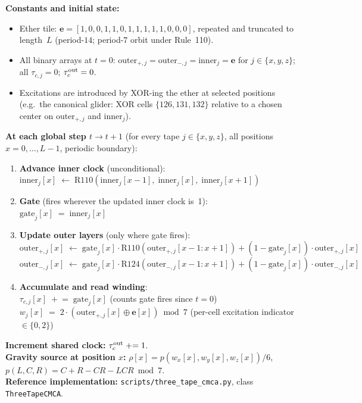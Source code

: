\documentclass[11pt]{article}
\theoremstyle{remark}
\newcommand{\taucout}{\tau_c^{\rm out}}
\newcommand{\ether}{\mathbf{e}}
\begin{document}
\begin{tcolorbox}[colback=gray!5,colframe=gray!50!black,
  title={\textbf{Algorithm~1: Three-Tape CMCA — Complete Per-Step Update}},
  fonttitle=\bfseries,left=6pt,right=6pt,top=5pt,bottom=5pt]
\small
\textbf{Constants and initial state:}
\begin{itemize}[noitemsep,topsep=2pt]
  \item Ether tile: $\mathbf{e} = [1,0,0,1,1,0,1,1,1,1,1,0,0,0]$,
        repeated and truncated to length~$L$ (period-$14$; period-$7$ orbit
        under Rule~110).
  \item All binary arrays at $t=0$: $\text{outer}_{+,j} =
        \text{outer}_{-,j} = \text{inner}_j = \ether$ for
        $j\in\{x,y,z\}$; all $\tau_{c,j} = 0$;
        $\taucout = 0$.
  \item Excitations are introduced by XOR-ing the ether at selected positions
        (e.g.\ the canonical glider: XOR cells $\{126,131,132\}$
        relative to a chosen center on $\text{outer}_{+,j}$ and
        $\text{inner}_j$).
\end{itemize}
\textbf{At each global step $t \to t+1$}
(for every tape $j \in \{x,y,z\}$,
all positions $x = 0,\ldots,L-1$, periodic boundary):
\begin{enumerate}[noitemsep,topsep=2pt]
  \item \textbf{Advance inner clock} (unconditional):\\
        $\text{inner}_j[x] \;\leftarrow\;
        \mathrm{R110}(\text{inner}_j[x{-}1],\;\text{inner}_j[x],\;
        \text{inner}_j[x{+}1])$
  \item \textbf{Gate} (fires wherever the updated inner clock is~1):\\
        $\text{gate}_j[x] \;=\; \text{inner}_j[x]$
  \item \textbf{Update outer layers} (only where gate fires):\\
        $\text{outer}_{+,j}[x] \;\leftarrow\; \text{gate}_j[x]
          \cdot\mathrm{R110}(\text{outer}_{+,j}[x{-}1{:}x{+}1])
          + (1-\text{gate}_j[x])\cdot\text{outer}_{+,j}[x]$\\
        $\text{outer}_{-,j}[x] \;\leftarrow\; \text{gate}_j[x]
          \cdot\mathrm{R124}(\text{outer}_{-,j}[x{-}1{:}x{+}1])
          + (1-\text{gate}_j[x])\cdot\text{outer}_{-,j}[x]$
  \item \textbf{Accumulate and read winding}:\\
        $\tau_{c,j}[x] \;\mathrel{+}=\; \text{gate}_j[x]$
        \hfill(counts gate fires since $t=0$)\\
        $w_j[x] \;=\; 2\cdot(\text{outer}_{+,j}[x] \oplus \ether[x])
          \bmod 7$
        \hfill(per-cell excitation indicator $\in\{0,2\}$)
\end{enumerate}
\textbf{Increment shared clock:} $\taucout \mathrel{+}= 1$.\\[2pt]
\textbf{Gravity source at position $x$:}
$\rho[x] = p(w_x[x],w_y[x],w_z[x])/6$,\quad
$p(L,C,R) = C+R-CR-LCR \bmod 7$.\\[2pt]
\textbf{Reference implementation:}
\texttt{scripts/three\_tape\_cmca.py}, class \texttt{ThreeTapeCMCA}.
\end{tcolorbox}
\end{document}
